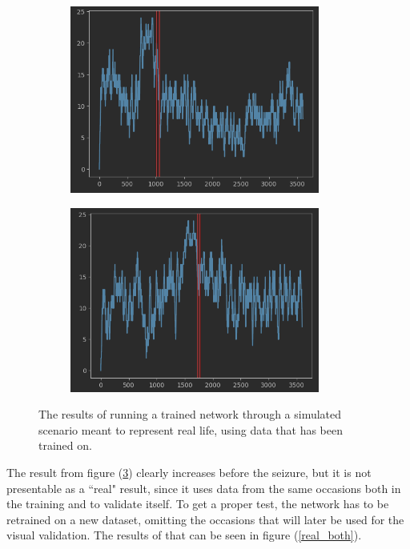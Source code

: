 \begin{figure}[H]
\centering
\begin{subfigure}{0.5\textwidth}
  \centering
  \includegraphics[width=0.9\textwidth]{images/f1-1.png}
  \caption{}
  \label{pre_sub1}
\end{subfigure}%
\begin{subfigure}{0.5\textwidth}
  \centering
  \includegraphics[width=0.9\textwidth]{images/f1-2.png}
  \caption{}
  \label{pre_sub2}
\end{subfigure}
\caption{The results of running a trained network through a simulated scenario meant to represent real life, using data that has been trained on.}
\label{pre_both}
\end{figure}

The result from figure (\ref{pre_both}) clearly increases before the seizure, but it is not presentable as a ``real" result, since it uses data from the same occasions both in the training and to validate itself. To get a proper test, the network has to be retrained on a new dataset, omitting the occasions that will later be used for the visual validation. The results of that can be seen in figure (\ref{real_both}).

